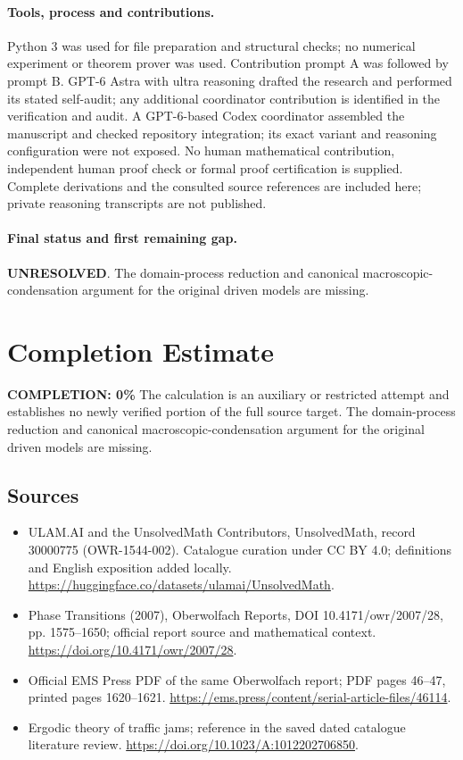 \documentclass[11pt]{article}
\begin{document}
\paragraph{Tools, process and contributions.}
Python 3 was used for file preparation and structural checks; no numerical experiment or theorem prover was used. Contribution prompt A was followed by prompt B. GPT-6 Astra with ultra reasoning drafted the research and performed its stated self-audit; any additional coordinator contribution is identified in the verification and audit. A GPT-6-based Codex coordinator assembled the manuscript and checked repository integration; its exact variant and reasoning configuration were not exposed. No human mathematical contribution, independent human proof check or formal proof certification is supplied. Complete derivations and the consulted source references are included here; private reasoning transcripts are not published.

\paragraph{Final status and first remaining gap.}
\textbf{UNRESOLVED}. The domain-process reduction and canonical macroscopic-condensation argument for the original driven models are missing.

\section{Completion Estimate}
\noindent\textbf{COMPLETION: 0\%}
The calculation is an auxiliary or restricted attempt and establishes no newly verified portion of the full source target. The domain-process reduction and canonical macroscopic-condensation argument for the original driven models are missing.

\subsection{Sources}
\begin{itemize}
\item[\hypertarget{source:30000775:1}{S1}] ULAM.AI and the UnsolvedMath Contributors, UnsolvedMath, record 30000775 (OWR-1544-002). Catalogue curation under CC BY 4.0; definitions and English exposition added locally.
\url{https://huggingface.co/datasets/ulamai/UnsolvedMath}.
\item[\hypertarget{source:30000775:2}{S2}] Phase Transitions (2007), Oberwolfach Reports, DOI 10.4171/owr/2007/28, pp. 1575--1650; official report source and mathematical context.
\url{https://doi.org/10.4171/owr/2007/28}.
\item[\hypertarget{source:30000775:3}{S3}] Official EMS Press PDF of the same Oberwolfach report; PDF pages 46--47, printed pages 1620--1621.
\url{https://ems.press/content/serial-article-files/46114}.
\item[\hypertarget{source:30000775:4}{S4}] Ergodic theory of traffic jams; reference in the saved dated catalogue literature review.
\url{https://doi.org/10.1023/A:1012202706850}.
\end{itemize}
\label{end:30000775}
\end{document}
